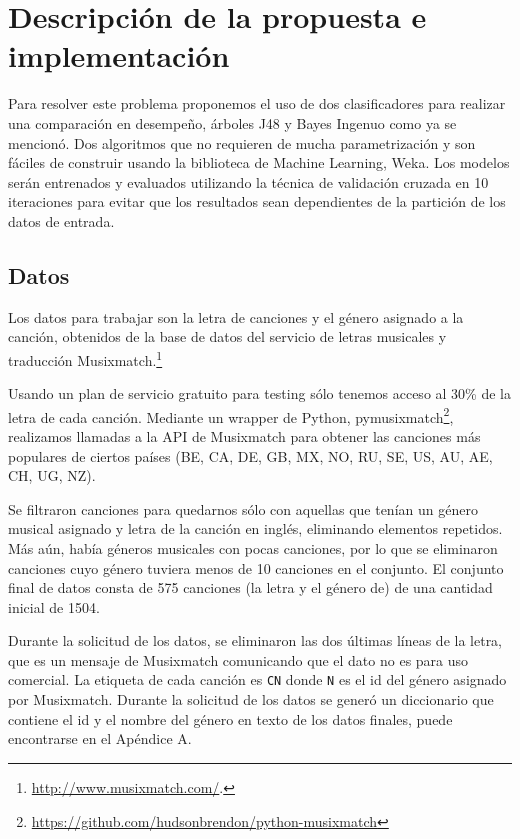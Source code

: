 \documentclass[spanish,11pt,letterpaper]{article}
\begin{document}
\section{Descripción de la propuesta e implementación}

Para resolver este problema proponemos el uso de dos clasificadores para realizar
una comparación en desempeño, árboles J48 y Bayes Ingenuo como ya se mencionó. Dos
algoritmos que no requieren de mucha parametrización y son fáciles de construir
usando la biblioteca de Machine Learning, Weka. Los modelos serán entrenados
y evaluados utilizando la técnica de validación cruzada en 10 iteraciones para
evitar que los resultados sean dependientes de la partición de los datos de entrada.

\subsection{Datos}

Los datos para trabajar son la letra de canciones y el género asignado a la canción,
obtenidos de la base de datos del servicio de letras musicales y traducción
Musixmatch.\footnote{\url{http://www.musixmatch.com/}.}

Usando un plan de servicio gratuito para testing sólo tenemos acceso al 30\% de
la letra de cada canción. Mediante un wrapper de Python,
pymusixmatch\footnote{\url{https://github.com/hudsonbrendon/python-musixmatch}},
realizamos llamadas a la API de Musixmatch para obtener las canciones más populares
de ciertos países (BE, CA, DE, GB, MX, NO, RU, SE, US, AU, AE, CH, UG, NZ).

Se filtraron canciones para quedarnos sólo con aquellas que tenían un género musical
asignado y letra de la canción en inglés, eliminando elementos repetidos.
Más aún, había géneros musicales con pocas canciones, por lo que se eliminaron
canciones cuyo género tuviera menos de 10 canciones en el conjunto. El conjunto final
de datos consta de 575 canciones (la letra y el género de) de una cantidad
inicial de 1504.

Durante la solicitud de los datos, se eliminaron las dos últimas líneas de la letra, que
es un mensaje de Musixmatch comunicando que el dato no es para uso comercial.
La etiqueta de cada canción es \texttt{CN} donde \texttt{N} es el id del género
asignado por Musixmatch. Durante la solicitud de los datos se generó un diccionario
que contiene el id y el nombre del género en texto de los datos finales,
puede encontrarse en el Apéndice A.
\end{document}
